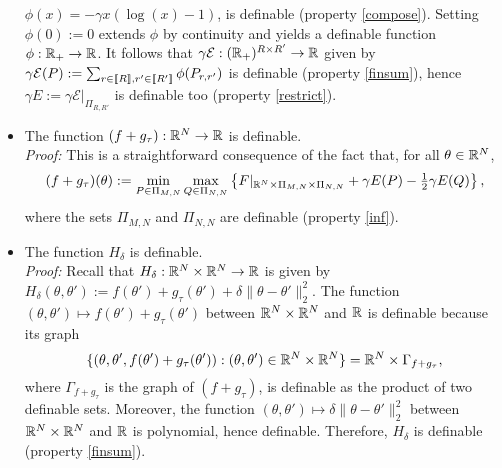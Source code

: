 \begin{itemize}
  $\phi(x) = -\gamma  x(\log(x) - 1)$, is  definable (property \ref{compose}).
  Setting $\phi(0) :=  0$ extends $\phi$ by continuity and  yields a definable
  function     $\phi:\mathbb{R}_{+}     \to      \mathbb{R}$.      It     follows     that
  $\gamma\mathcal{E}   :  (\mathbb{R}_{+})^{R   \times  R'}   \to  \mathbb{R}$   given  by
  $\gamma\mathcal{E}  (P)  := \sum_{r  \in  \llbracket  R \rrbracket,  r'  \in  \llbracket R'  \rrbracket}
  \phi(P_{r,r'})$    is     definable    (property     \ref{finsum}),    hence
  $\gamma  E:=  \gamma\mathcal{E}|_{\Pi_{R,R'}}$  is definable  too  (property
  \ref{restrict}).
\item The function $(f+g_{\tau}) : \mathbb{R}^{N} \to \mathbb{R}$ is definable. \\
  \textit{Proof:} This is a straightforward  consequence of the fact that, for
  all $\theta \in \mathbb{R}^{N}$,
  \begin{equation*}
    (f  +   g_{\tau})(\theta)  :=   \min_{P\in\Pi_{M,N}}  \max_{Q\in\Pi_{N,N}}
    \left\{ F|_{\mathbb{R}^{N} \times  \Pi_{M,N} \times \Pi_{N,N} } +  \gamma E(P) -
      \tfrac{1}{2} \gamma E(Q) \right\}, 
  \end{equation*}
  where  the   sets  $\Pi_{M,N}$  and  $\Pi_{N,N}$   are  definable  (property
  \ref{inf}). %
\item         The        function         $H_{\delta}$   is definable.\\
  \textit{Proof:} Recall that $H_{\delta} : \mathbb{R}^{N} \times \mathbb{R}^{N} \to \mathbb{R}$
  is                                  given                                 by
  $H_{\delta} (\theta,  \theta') := f(\theta')  + g_{\tau} (\theta')  + \delta
  \|\theta         -         \theta'\|_{2}^{2}$.          The         function
  $(\theta,\theta')   \mapsto   f(\theta')    +   g_{\tau}(\theta')$   between
  $\mathbb{R}^{N} \times \mathbb{R}^{N}$ and $\mathbb{R}$ is definable because its graph
  \begin{equation*}
    \{(\theta,\theta',f(\theta') +  g_{\tau}(\theta')) :  (\theta,\theta') \in
    \mathbb{R}^{N} \times \mathbb{R}^{N}\} = \mathbb{R}^{N} \times \Gamma_{f+g_{\tau}},
  \end{equation*}
  where $\Gamma_{f+g_{\tau}}$ is  the graph of $(f +  g_{\tau})$, is definable
  as   the  product   of   two  definable   sets.    Moreover,  the   function
  $(\theta,\theta')  \mapsto  \delta  \|\theta  -  \theta'\|_{2}^{2}$  between
  $\mathbb{R}^{N}    \times   \mathbb{R}^{N}$    and   $\mathbb{R}$    is   polynomial,    hence
  definable. Therefore, $H_{\delta}$ is definable (property \ref{finsum}). 
\end{itemize}

